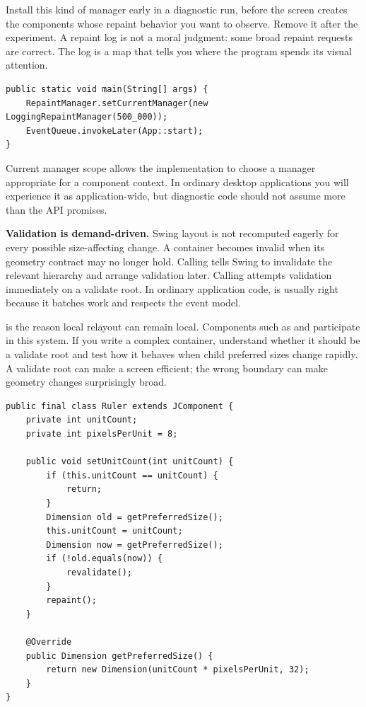 Install this kind of manager early in a diagnostic run, before the screen creates the components whose repaint behavior you want to observe. Remove it after the experiment. A repaint log is not a moral judgment: some broad repaint requests are correct. The log is a map that tells you where the program spends its visual attention.

\begin{lstlisting}
public static void main(String[] args) {
    RepaintManager.setCurrentManager(new LoggingRepaintManager(500_000));
    EventQueue.invokeLater(App::start);
}
\end{lstlisting}

\begin{detailbox}{Current manager scope}
 allows the implementation to choose a manager appropriate for a component context. In ordinary desktop applications you will experience it as application-wide, but diagnostic code should not assume more than the API promises.
\end{detailbox}

\textbf{Validation is demand-driven.} Swing layout is not recomputed eagerly for every possible size-affecting change. A container becomes invalid when its geometry contract may no longer hold. Calling  tells Swing to invalidate the relevant hierarchy and arrange validation later. Calling  attempts validation immediately on a validate root. In ordinary application code,  is usually right because it batches work and respects the event model.

 is the reason local relayout can remain local. Components such as  and  participate in this system. If you write a complex container, understand whether it should be a validate root and test how it behaves when child preferred sizes change rapidly. A validate root can make a screen efficient; the wrong boundary can make geometry changes surprisingly broad.

\begin{lstlisting}[caption={A component whose preferred size depends on data must invalidate geometry when the size changes.}]
public final class Ruler extends JComponent {
    private int unitCount;
    private int pixelsPerUnit = 8;

    public void setUnitCount(int unitCount) {
        if (this.unitCount == unitCount) {
            return;
        }
        Dimension old = getPreferredSize();
        this.unitCount = unitCount;
        Dimension now = getPreferredSize();
        if (!old.equals(now)) {
            revalidate();
        }
        repaint();
    }

    @Override
    public Dimension getPreferredSize() {
        return new Dimension(unitCount * pixelsPerUnit, 32);
    }
}
\end{lstlisting}

